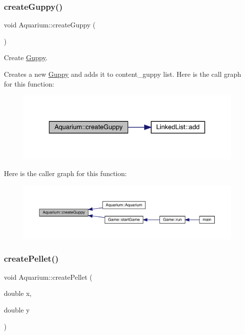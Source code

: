 \subsubsection{\texorpdfstring{create\+Guppy()}{createGuppy()}}
{\footnotesize\ttfamily void Aquarium\+::create\+Guppy (\begin{DoxyParamCaption}{ }\end{DoxyParamCaption})}



Create \mbox{\hyperlink{class_guppy}{Guppy}}. 

Creates a new \mbox{\hyperlink{class_guppy}{Guppy}} and adds it to content\+\_\+guppy list. Here is the call graph for this function\+:\nopagebreak
\begin{figure}[H]
\begin{center}
\leavevmode
\includegraphics[width=321pt]{class_aquarium_a44ab0beff51d6607e0f590270d9066b5_cgraph}
\end{center}
\end{figure}
Here is the caller graph for this function\+:\nopagebreak
\begin{figure}[H]
\begin{center}
\leavevmode
\includegraphics[width=350pt]{class_aquarium_a44ab0beff51d6607e0f590270d9066b5_icgraph}
\end{center}
\end{figure}
\mbox{\label{class_aquarium_a049ffa77e7bbb68ac031a098c4e635e7}} 
\subsubsection{\texorpdfstring{create\+Pellet()}{createPellet()}}
{\footnotesize\ttfamily void Aquarium\+::create\+Pellet (\begin{DoxyParamCaption}\item[{double}]{x,  }\item[{double}]{y }\end{DoxyParamCaption})}



